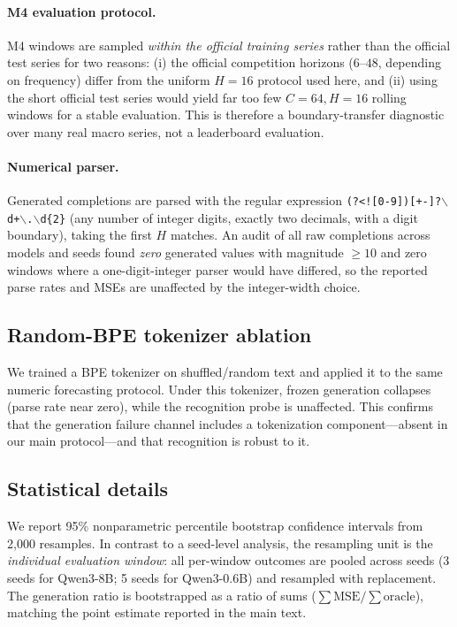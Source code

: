 \documentclass{article}
\begin{document}
\paragraph{M4 evaluation protocol.}
M4 windows are sampled \emph{within the official training series} rather than
the official test series for two reasons: (i) the official competition
horizons ($6$--$48$, depending on frequency) differ from the uniform $H{=}16$
protocol used here, and (ii) using the short official test series would yield
far too few $C{=}64,H{=}16$ rolling windows for a stable evaluation.  This is
therefore a boundary-transfer diagnostic over many real macro series, not a
leaderboard evaluation.

\paragraph{Numerical parser.}
Generated completions are parsed with the regular expression
\texttt{(?<![0-9])[+-]?$\backslash$d+$\backslash$.$\backslash$d\{2\}} (any number
of integer digits, exactly two decimals, with a digit boundary), taking the
first $H$ matches.  An audit of all raw completions across models and seeds
found \emph{zero} generated values with magnitude $\geq 10$ and zero windows
where a one-digit-integer parser would have differed, so the reported parse
rates and MSEs are unaffected by the integer-width choice.

\subsection{Random-BPE tokenizer ablation}
\label{app:random_bpe}
We trained a BPE tokenizer on shuffled/random text and applied it to the same
numeric forecasting protocol.  Under this tokenizer, frozen generation
collapses (parse rate near zero), while the recognition probe is unaffected.
This confirms that the generation failure channel includes a tokenization
component---absent in our main protocol---and that recognition is robust to it.

\subsection{Statistical details}
\label{app:bootstrap}
We report 95\% nonparametric percentile bootstrap confidence intervals from
2,000 resamples.  In contrast to a seed-level analysis, the resampling unit is
the \emph{individual evaluation window}: all per-window outcomes are pooled
across seeds (3 seeds for Qwen3-8B; 5 seeds for Qwen3-0.6B) and resampled
with replacement.  The generation ratio is bootstrapped as a ratio of sums
($\sum\text{MSE}/\sum\text{oracle}$), matching the point estimate reported in
the main text.
\end{document}
